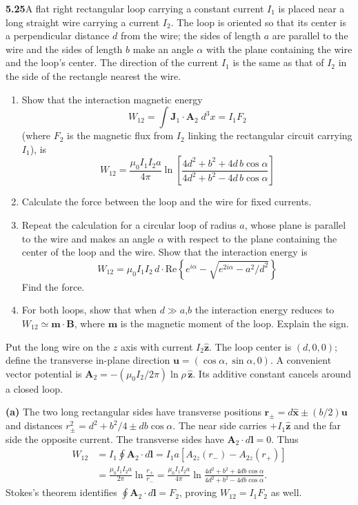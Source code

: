 \par\bigskip
\noindent\textbf{5.25}\quad A flat right rectangular loop carrying a constant current $I_{1}$ is placed near a long straight wire carrying a current $I_{2}$. The loop is oriented so that its center is a perpendicular distance $d$ from the wire; the sides of length $a$ are parallel to the wire and the sides of length $b$ make an angle $\alpha$ with the plane containing the wire and the loop's center. The direction of the current $I_{1}$ is the same as that of $I_{2}$ in the side of the rectangle nearest the wire.
\begin{enumerate}
\item[(a)] Show that the interaction magnetic energy
\[
W_{12}=\int\mathbf{J}_{1}\cdot\mathbf{A}_{2}\;d^{3}x=I_{1}F_{2}
\]
(where $F_{2}$ is the magnetic flux from $I_{2}$ linking the rectangular circuit carrying $I_{1}$), is
\[
W_{12}=\frac{\mu_{0}I_{1}I_{2}a}{4\pi}\ln\!\left[\frac{4d^{2}+b^{2}+4d\,b\cos\alpha}{4d^{2}+b^{2}-4d\,b\cos\alpha}\right]
\]
\item[(b)] Calculate the force between the loop and the wire for fixed currents.
\item[(c)] Repeat the calculation for a circular loop of radius $a$, whose plane is parallel to the wire and makes an angle $\alpha$ with respect to the plane containing the center of the loop and the wire. Show that the interaction energy is
\[
W_{12}=\mu_{0}I_{1}I_{2}\,d\cdot\mathrm{Re}\left\{e^{i\alpha}-\sqrt{e^{2i\alpha}-a^{2}/d^{2}}\right\}
\]
Find the force.
\item[(d)] For both loops, show that when $d\gg a$,$b$ the interaction energy reduces to $W_{12}\simeq\mathbf{m}\cdot\mathbf{B}$, where $\mathbf{m}$ is the magnetic moment of the loop. Explain the sign.
\end{enumerate}
\solution
Put the long wire on the $z$ axis with current $I_2\widehat{\mathbf z}$.
The loop center is $(d,0,0)$; define the transverse in-plane direction
$\mathbf u=(\cos\alpha,\sin\alpha,0)$. A convenient vector potential is
$\mathbf A_2=-(\mu_0I_2/2\pi)\ln\rho\,\widehat{\mathbf z}$.
Its additive constant cancels around a closed loop.

\textbf{(a)} The two long rectangular sides have transverse positions
$\mathbf r_\pm=d\widehat{\mathbf x}\pm(b/2)\mathbf u$ and distances
$r_\pm^2=d^2+b^2/4\pm db\cos\alpha$.
The near side carries $+I_1\widehat{\mathbf z}$ and the far side the
opposite current. The transverse sides have $\mathbf A_2\cdot d\mathbf l=0$.
Thus
\[
\begin{split}
W_{12}&=I_1\oint\mathbf A_2\cdot d\mathbf l
=I_1a[A_{2z}(r_-)-A_{2z}(r_+)]\\
&=\frac{\mu_0I_1I_2a}{2\pi}\ln\frac{r_+}{r_-}
=\boxed{\frac{\mu_0I_1I_2a}{4\pi}
\ln\frac{4d^2+b^2+4db\cos\alpha}
{4d^2+b^2-4db\cos\alpha}.}
\end{split}
\]
Stokes's theorem identifies $\oint\mathbf A_2\cdot d\mathbf l=F_2$,
proving $W_{12}=I_1F_2$ as well.

